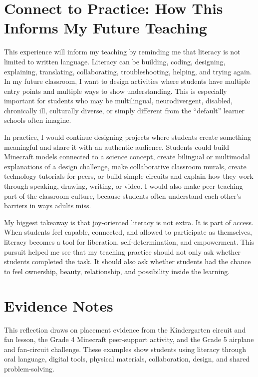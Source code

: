 \documentclass[12pt]{article}
\begin{document}
\section*{Connect to Practice: How This Informs My Future Teaching}

This experience will inform my teaching by reminding me that literacy is not limited to written language. Literacy can be building, coding, designing, explaining, translating, collaborating, troubleshooting, helping, and trying again. In my future classroom, I want to design activities where students have multiple entry points and multiple ways to show understanding. This is especially important for students who may be multilingual, neurodivergent, disabled, chronically ill, culturally diverse, or simply different from the ``default'' learner schools often imagine.

In practice, I would continue designing projects where students create something meaningful and share it with an authentic audience. Students could build Minecraft models connected to a science concept, create bilingual or multimodal explanations of a design challenge, make collaborative classroom murals, create technology tutorials for peers, or build simple circuits and explain how they work through speaking, drawing, writing, or video. I would also make peer teaching part of the classroom culture, because students often understand each other's barriers in ways adults miss.

My biggest takeaway is that joy-oriented literacy is not extra. It is part of access. When students feel capable, connected, and allowed to participate as themselves, literacy becomes a tool for liberation, self-determination, and empowerment. This pursuit helped me see that my teaching practice should not only ask whether students completed the task. It should also ask whether students had the chance to feel ownership, beauty, relationship, and possibility inside the learning.

\section*{Evidence Notes}

This reflection draws on placement evidence from the Kindergarten circuit and fan lesson, the Grade 4 Minecraft peer-support activity, and the Grade 5 airplane and fan-circuit challenge. These examples show students using literacy through oral language, digital tools, physical materials, collaboration, design, and shared problem-solving.
\end{document}
